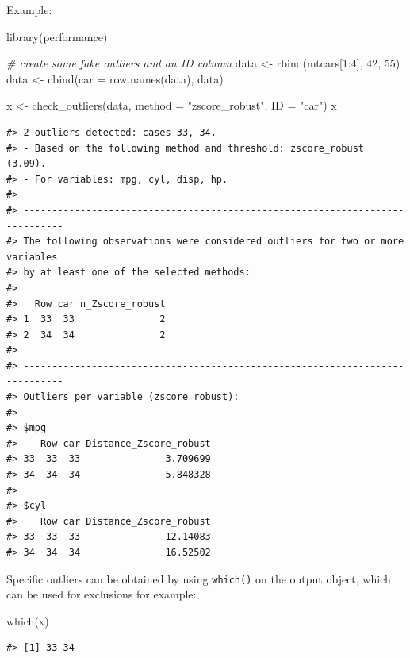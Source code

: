 \documentclass[
]{article}
\newenvironment{Shaded}{\begin{snugshade}}{\end{snugshade}}
\newcommand{\AttributeTok}[1]{\textcolor[rgb]{0.77,0.63,0.00}{#1}}
\newcommand{\CommentTok}[1]{\textcolor[rgb]{0.56,0.35,0.01}{\textit{#1}}}
\newcommand{\DecValTok}[1]{\textcolor[rgb]{0.00,0.00,0.81}{#1}}
\newcommand{\FunctionTok}[1]{\textcolor[rgb]{0.00,0.00,0.00}{#1}}
\newcommand{\NormalTok}[1]{#1}
\newcommand{\OtherTok}[1]{\textcolor[rgb]{0.56,0.35,0.01}{#1}}
\newcommand{\SpecialCharTok}[1]{\textcolor[rgb]{0.00,0.00,0.00}{#1}}
\newcommand{\StringTok}[1]{\textcolor[rgb]{0.31,0.60,0.02}{#1}}
\begin{document}
Example:

\begin{Shaded}
\begin{Highlighting}[]
\FunctionTok{library}\NormalTok{(performance)}

\CommentTok{\# create some fake outliers and an ID column}
\NormalTok{data }\OtherTok{\textless{}{-}} \FunctionTok{rbind}\NormalTok{(mtcars[}\DecValTok{1}\SpecialCharTok{:}\DecValTok{4}\NormalTok{], }\DecValTok{42}\NormalTok{, }\DecValTok{55}\NormalTok{)}
\NormalTok{data }\OtherTok{\textless{}{-}} \FunctionTok{cbind}\NormalTok{(}\AttributeTok{car =} \FunctionTok{row.names}\NormalTok{(data), data)}

\NormalTok{x }\OtherTok{\textless{}{-}} \FunctionTok{check\_outliers}\NormalTok{(data, }\AttributeTok{method =} \StringTok{"zscore\_robust"}\NormalTok{, }\AttributeTok{ID =} \StringTok{"car"}\NormalTok{)}
\NormalTok{x}
\end{Highlighting}
\end{Shaded}

\begin{verbatim}
#> 2 outliers detected: cases 33, 34.
#> - Based on the following method and threshold: zscore_robust (3.09).
#> - For variables: mpg, cyl, disp, hp.
#> 
#> -----------------------------------------------------------------------------
#> The following observations were considered outliers for two or more variables 
#> by at least one of the selected methods: 
#> 
#>   Row car n_Zscore_robust
#> 1  33  33               2
#> 2  34  34               2
#> 
#> -----------------------------------------------------------------------------
#> Outliers per variable (zscore_robust): 
#> 
#> $mpg
#>    Row car Distance_Zscore_robust
#> 33  33  33               3.709699
#> 34  34  34               5.848328
#> 
#> $cyl
#>    Row car Distance_Zscore_robust
#> 33  33  33               12.14083
#> 34  34  34               16.52502
\end{verbatim}

Specific outliers can be obtained by using \texttt{which()} on the output object, which can be used for exclusions for example:

\begin{Shaded}
\begin{Highlighting}[]
\FunctionTok{which}\NormalTok{(x)}
\end{Highlighting}
\end{Shaded}

\begin{verbatim}
#> [1] 33 34
\end{verbatim}
\end{document}
